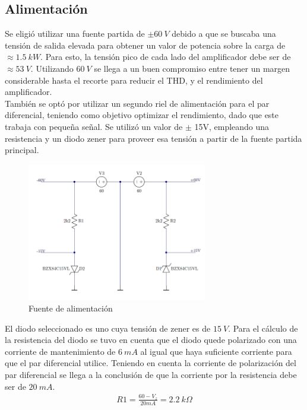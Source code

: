 
\subsection{Alimentación}
Se eligió utilizar una fuente partida de $\pm60 \ V$  debido a que se buscaba una tensión de salida elevada para obtener un valor de potencia sobre la carga de $\approx 1.5 \ kW$. Para esto, la tensión pico de cada lado del amplificador debe ser de $\approx 53 \ V$. Utilizando $60 \ V$ se llega a un buen compromiso entre tener un margen considerable hasta el recorte para reducir el THD, y el rendimiento del amplificador.\\ 
También se optó por utilizar un segundo riel de alimentación para el par diferencial, teniendo como objetivo optimizar el rendimiento, dado que este trabaja con pequeña señal. Se utilizó un valor de $\pm$ 15V, empleando una resistencia y un diodo zener para proveer esa tensión a partir de la fuente partida principal.
\begin{figure}[H]
\centering
	\includegraphics[width=0.7\textwidth]{ImagenesAlimentacion/al.png}
	\caption{Fuente de alimentación}
	\label{fig:alimentacion}
\end{figure}
El diodo seleccionado es uno cuya tensión de zener es de $15 \ V$.
Para el cálculo de la resistencia del diodo se tuvo en cuenta que el diodo quede polarizado con una corriente de mantenimiento de $6 \ mA$ al igual que haya suficiente corriente para que el par diferencial utilice. Teniendo en cuenta la corriente de polarización del par diferencial se llega a la conclusión de que la corriente por la resistencia debe ser de $20 \ mA$.
\begin{align}
R1=\frac{60-V_z}{20mA}= 2.2 \ k\Omega
\end{align}
